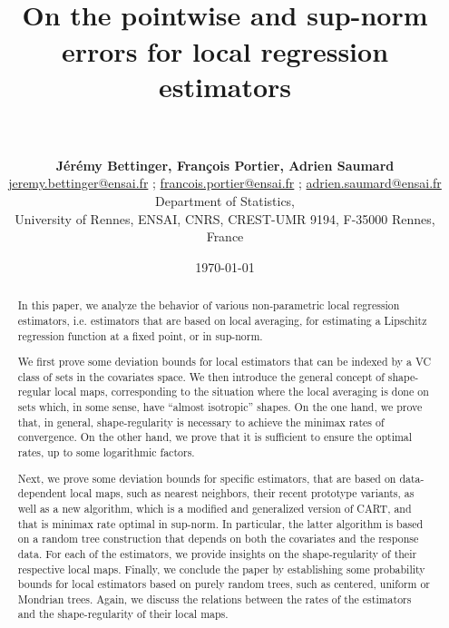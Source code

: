 \documentclass[paper=a4, fontsize=11pt]{scrartcl}
\title{
		\vspace{-1in} 	
		\usefont{OT1}{bch}{b}{n}
		\horrule{0.5pt} \\[0.4cm]
		\Large On the pointwise and sup-norm errors for local regression estimators
		\\
		\horrule{2pt} \\[0.1cm]
}
\date{\large \today}
\author{ \textbf{Jérémy Bettinger, François Portier, Adrien Saumard} \\
\large \href{mailto:jeremy.bettinger@ensai.fr}{jeremy.bettinger@ensai.fr} ; \href{mailto:francois.portier@ensai.fr}{francois.portier@ensai.fr} ; \href{mailto:adrien.saumard@ensai.fr}{adrien.saumard@ensai.fr} \\
\large Department of Statistics, \\
\large University of Rennes, ENSAI, CNRS, CREST-UMR 9194, F-35000 Rennes, France }
\begin{document}
\maketitle

\begin{abstract}
 
 
 In this paper, we analyze the behavior of various non-parametric local regression estimators, i.e. estimators that are based on local averaging, for estimating a Lipschitz regression function at a fixed point, or in sup-norm. 
 
 We first prove some deviation bounds for local estimators that can be indexed by a VC class of sets in the covariates space. We then introduce the general concept of shape-regular local maps, corresponding to the situation where the local averaging is done on sets which, in some sense, have ``almost isotropic'' shapes. On the one hand, we prove that, in general, shape-regularity is necessary to achieve the minimax rates of convergence. On the other hand, we prove that it is sufficient to ensure the optimal rates, up to some logarithmic factors. 
 
 Next, we prove some deviation bounds for specific estimators, that are based on data-dependent local maps, such as nearest neighbors, their recent prototype variants, as well as a new algorithm, which is a modified and generalized version of CART, and that is minimax rate optimal in sup-norm. In particular, the latter algorithm is based on a random tree construction that depends on both the covariates and the response data. For each of the estimators, we provide insights on the shape-regularity of their respective local maps. Finally, we conclude the paper by establishing some probability bounds for local estimators based on purely random trees, such as centered, uniform or Mondrian trees. Again, we discuss the relations between the rates of the estimators and the shape-regularity of their local maps.


 

  
 
\end{abstract}
\end{document}
